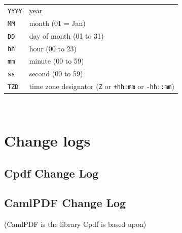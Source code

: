 \documentclass{book}
\begin{document}
\medskip
\begin{tabular}{ll}
\texttt{YYYY} & year \\
\texttt{MM} & month (01 = Jan)\\
\texttt{DD} & day of month (01 to 31)\\
\texttt{hh} & hour (00 to 23)\\
\texttt{mm} & minute (00 to 59)\\
\texttt{ss} & second (00 to 59)\\
\texttt{TZD} & time zone designator (\texttt{Z} or \texttt{+hh:mm} or \texttt{-hh::mm})
\end{tabular}
\pagestyle{fancy}

\ \ \ 

\vfill
\chapter{Change logs}

\section{Cpdf Change Log}
{\footnotesize\begin{alltt}

\end{alltt}}

\section{CamlPDF Change Log}
(CamlPDF is the library Cpdf is based upon)

{\footnotesize\begin{alltt}

\end{alltt}}

\pagestyle{empty}


\end{document}
